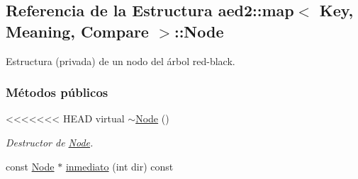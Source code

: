 \hypertarget{structaed2_1_1map_1_1Node}{\subsection{\-Referencia de la \-Estructura aed2\-:\-:map$<$ \-Key, \-Meaning, \-Compare $>$\-:\-:\-Node}
\label{structaed2_1_1map_1_1Node}
}


\-Estructura (privada) de un nodo del árbol red-\/black.  


\subsubsection*{\-Métodos públicos}
\begin{DoxyCompactItemize}
\item 
<<<<<<< HEAD
virtual \hyperlink{structaed2_1_1map_1_1Node_a4f3cb2cc4302fe96432e624ced147540_a4f3cb2cc4302fe96432e624ced147540}{$\sim$\-Node} ()
\begin{DoxyCompactList}\small\item\em \-Destructor de \hyperlink{structaed2_1_1map_1_1Node}{\-Node}. \end{DoxyCompactList}\item 
const \hyperlink{structaed2_1_1map_1_1Node}{\-Node} $\ast$ \hyperlink{structaed2_1_1map_1_1Node_a4d5263c74ea5f78025fea331267730ce_a4d5263c74ea5f78025fea331267730ce}{inmediato} (int dir) const 
\end{DoxyCompactItemize}
